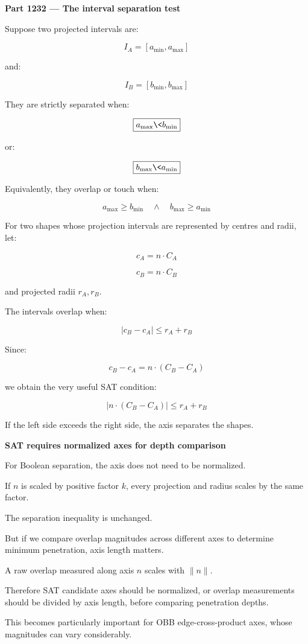 \textbf{Part 1232 --- The interval separation test}

Suppose two projected intervals are:

\[
I_A=[a_{\min},a_{\max}]
\]

and:

\[
I_B=[b_{\min},b_{\max}]
\]

They are strictly separated when:

\[
\boxed{ a_{\max}\<b_{\min} }
\]

or:

\[
\boxed{ b_{\max}\<a_{\min} }
\]

Equivalently, they overlap or touch when:

\[
\boxed{ a_{\max}\ge b_{\min} \quad\land\quad b_{\max}\ge a_{\min} }
\]

For two shapes whose projection intervals are represented by centres and radii, let:

\[
c_A=n\cdot C_A
\]

\[
c_B=n\cdot C_B
\]

and projected radii \(r_A,r_B\).

The intervals overlap when:

\[
\boxed{ |c_B-c_A|\le r_A+r_B }
\]

Since:

\[
c_B-c_A=n\cdot(C_B-C_A)
\]

we obtain the very useful SAT condition:

\[
\boxed{ |n\cdot(C_B-C_A)|\le r_A+r_B }
\]

If the left side exceeds the right side, the axis separates the shapes.

\textbf{SAT requires normalized axes for depth comparison}

For Boolean separation, the axis does not need to be normalized.

If \(n\) is scaled by positive factor \(k\), every projection and radius scales by the same factor.

The separation inequality is unchanged.

But if we compare overlap magnitudes across different axes to determine minimum penetration, axis length matters.

A raw overlap measured along axis \(n\) scales with \(\|n\|\).

Therefore SAT candidate axes should be normalized, or overlap measurements should be divided by axis length, before comparing penetration depths.

This becomes particularly important for OBB edge-cross-product axes, whose magnitudes can vary considerably.

